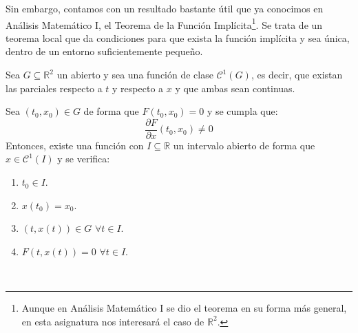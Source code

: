 Sin embargo, contamos con un resultado bastante útil que ya conocimos en Análisis Matemático I, el Teorema de la Función Implícita\footnote{Aunque en Análisis Matemático I se dio el teorema en su forma más general, en esta asignatura nos interesará el caso de $\mathbb{R}^2$.}. Se trata de un teorema local que da condiciones para que exista la función implícita y sea única, dentro de un entorno suficientemente pequeño.

\begin{teo}
    Sea $G\subseteq \mathbb{R}^2$ un abierto y sea
    una función de clase $\mathcal{C}^1(G)$, es decir, que existan las parciales respecto a $t$ y respecto a $x$ y que ambas sean continuas.

    \noindent
    Sea $(t_0,x_0)\in G$ de forma que $F(t_0,x_0)=0$ y se cumpla que:
    \begin{equation*}
        \dfrac{\partial F}{\partial x}(t_0,x_0) \neq 0
    \end{equation*}
    Entonces, existe una función 
    con $I\subseteq \mathbb{R}$ un intervalo abierto de forma que $x\in \mathcal{C}^1(I)$ y se verifica:
    \begin{enumerate}
        \item $t_0 \in I$.
        \item $x(t_0) = x_0$.
        \item $(t,x(t))\in G$ $\forall t\in I$.
        \item $F(t,x(t))=0$ $\forall t\in I$.
    \end{enumerate}
\end{teo}~\\

